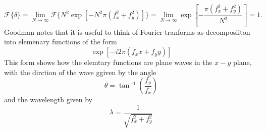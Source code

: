 \documentclass[../../main.tex]{subfiles}
\begin{document}
\begin{equation}\label{eq. dirac delta limit transform}
    \mathcal{F}\{\delta\}=\lim_{N\to\infty}\mathcal{F}\{N^2\exp{\left[-N^2\pi(f_x^2+f_y^2)\right]}\}=\lim_{N\to\infty}\exp{\left[-\frac{\pi(f_x^2+f_y^2)}{N^2}\right]}=1.
\end{equation}
Goodman notes that it is useful to think of Fourier tranforms as decomposiiton into elemenary functions of the form 
\begin{equation}\label{eq. elementary function}
    \exp{\left[-i2\pi(f_x x+f_yy)\right]}
\end{equation}
This form shows how the elemtary functions are plane waves in the $x-y$ plane, with the dirction of the wave ggiven by the angle 
\begin{equation}\label{eq. elementary function angle}
    \theta=\tan^{-1}\left(\frac{f_y}{f_x}\right)
\end{equation}
and the wavelength given by
\begin{equation}\label{eq. elementary function wavelength}
    \lambda=\frac{1}{\sqrt{f_x^2+f_y^2}}
\end{equation}
\end{document}
